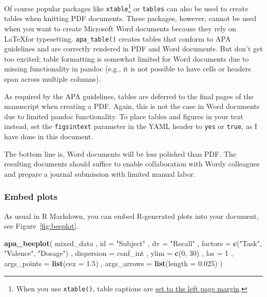 \documentclass[
  man,floatsintext]{apa6}
\newenvironment{Shaded}{\begin{snugshade}}{\end{snugshade}}
\newcommand{\AttributeTok}[1]{\textcolor[rgb]{0.13,0.29,0.53}{#1}}
\newcommand{\DecValTok}[1]{\textcolor[rgb]{0.00,0.00,0.81}{#1}}
\newcommand{\FloatTok}[1]{\textcolor[rgb]{0.00,0.00,0.81}{#1}}
\newcommand{\FunctionTok}[1]{\textcolor[rgb]{0.13,0.29,0.53}{\textbf{#1}}}
\newcommand{\NormalTok}[1]{#1}
\newcommand{\StringTok}[1]{\textcolor[rgb]{0.31,0.60,0.02}{#1}}
\begin{document}
Of course popular packages like \texttt{xtable}\footnote{When you use \texttt{xtable()}, table captions are \href{http://tex.stackexchange.com/questions/42209/centering-tables-in-document-class-apa6}{set to the left page margin}.} or \texttt{tables} can also be used to create tables when knitting PDF documents.
These packages, however, cannot be used when you want to create Microsoft Word documents because they rely on \LaTeX for typesetting.
\texttt{apa\_table()} creates tables that conform to APA guidelines and are correctly rendered in PDF and Word documents.
But don't get too excited; table formatting is somewhat limited for Word documents due to missing functionality in pandoc (e.g., it is not possible to have cells or headers span across multiple columns).

As required by the APA guidelines, tables are deferred to the final pages of the manuscript when creating a PDF.
Again, this is not the case in Word documents due to limited pandoc functionality.
To place tables and figures in your text instead, set the \texttt{figsintext} parameter in the YAML header to \texttt{yes} or \texttt{true}, as I have done in this document.

The bottom line is, Word documents will be less polished than PDF.
The resulting documents should suffice to enable collaboration with Wordy colleagues and prepare a journal submission with limited manual labor.

\subsubsection{Embed plots}\label{embed-plots}

As usual in R Markdown, you can embed R-generated plots into your document, see Figure~\ref{fig:beeplot}.



\begin{Shaded}
\begin{Highlighting}[]
\FunctionTok{apa\_beeplot}\NormalTok{(}
\NormalTok{  mixed\_data}
\NormalTok{  , }\AttributeTok{id =} \StringTok{"Subject"}
\NormalTok{  , }\AttributeTok{dv =} \StringTok{"Recall"}
\NormalTok{  , }\AttributeTok{factors =} \FunctionTok{c}\NormalTok{(}\StringTok{"Task"}\NormalTok{, }\StringTok{"Valence"}\NormalTok{, }\StringTok{"Dosage"}\NormalTok{)}
\NormalTok{  , }\AttributeTok{dispersion =}\NormalTok{ conf\_int}
\NormalTok{  , }\AttributeTok{ylim =} \FunctionTok{c}\NormalTok{(}\DecValTok{0}\NormalTok{, }\DecValTok{30}\NormalTok{)}
\NormalTok{  , }\AttributeTok{las =} \DecValTok{1}
\NormalTok{  , }\AttributeTok{args\_points =} \FunctionTok{list}\NormalTok{(}\AttributeTok{cex =} \FloatTok{1.5}\NormalTok{)}
\NormalTok{  , }\AttributeTok{args\_arrows =} \FunctionTok{list}\NormalTok{(}\AttributeTok{length =} \FloatTok{0.025}\NormalTok{)}
\NormalTok{)}
\end{Highlighting}
\end{Shaded}
\end{document}
